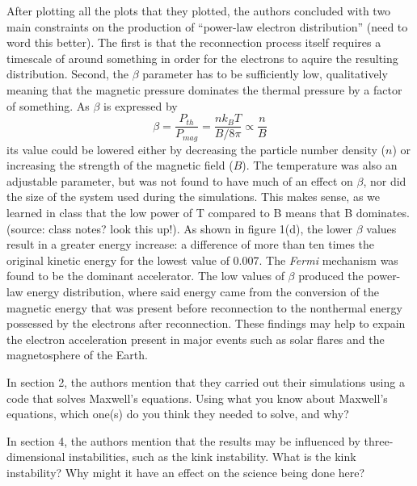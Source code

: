 \documentclass[12pt]{article}
\begin{document}
After plotting all the plots that they plotted, the authors
concluded with two main constraints on the production of ``power-law
electron distribution'' (need to word this better). The first is that
the reconnection process itself requires a timescale of around
something in order for the electrons to aquire the resulting
distribution. Second, the $\beta$ parameter has to be sufficiently
low, qualitatively meaning that the magnetic pressure dominates the
thermal pressure by a factor of something. As $\beta$ is expressed by
    $$ \beta = \frac{P_{th}}{P_{mag}} = \frac{nk_BT}{B/8\pi}
        \propto \frac{n}{B}$$
its value could be lowered either by decreasing the particle number
density ($n$) or increasing the strength of the magnetic field ($B$).
The temperature was also an adjustable parameter, but was not found to
have much of an effect on $\beta$, nor did the size of the system used
during the simulations. This makes sense, as we learned in
class that the low power of T compared to B means that B dominates.
(source: class notes? look this up!). 
As shown in figure 1(d), the lower $\beta$ values result in a greater
energy increase: a difference of more than ten times the original
kinetic energy for the lowest value of 0.007. 
The \emph{Fermi} mechanism was found to be the dominant accelerator.
The low values of $\beta$ produced the power-law energy
distribution, where said energy came from the conversion of the magnetic
energy that was present before reconnection to the nonthermal energy
possessed by the electrons after reconnection.
These findings may help to expain the electron acceleration present in
major events such as solar flares and the magnetosphere of the Earth.

\newpage
In section 2, the authors mention that they carried out their
simulations using a code that solves Maxwell's equations. Using what
you know about Maxwell's equations, which one(s) do you think they
needed to solve, and why?

In section 4, the authors mention that the results may be
influenced by three-dimensional instabilities, such as the kink
instability. What is the kink instability? Why might it have an effect
on the science being done here?
\end{document}
